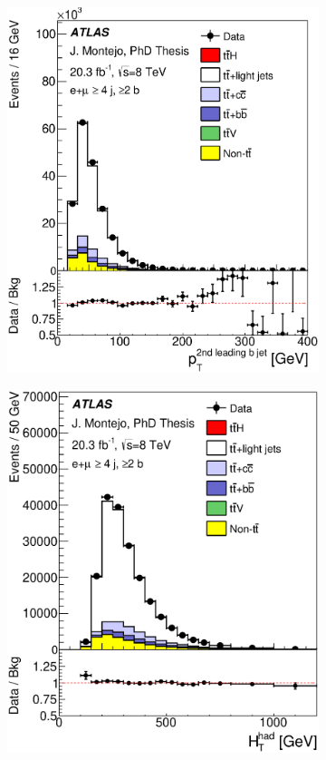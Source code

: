 \begin{figure}[tp!]
\begin{subfigure}{0.32\textwidth}
  \includegraphics[width=\textwidth]{Modeling/Figures/plots_4j2b/bjet2_pt_ELEMUON_4jetin2btagin_NOMINAL.eps}             
  \caption{} \end{subfigure}
  \begin{subfigure}{0.32\textwidth}
  \includegraphics[width=\textwidth]{Modeling/Figures/plots_4j2b/HTj_ELEMUON_4jetin2btagin_NOMINAL.eps}                  

\end{subfigure}
\end{figure}
